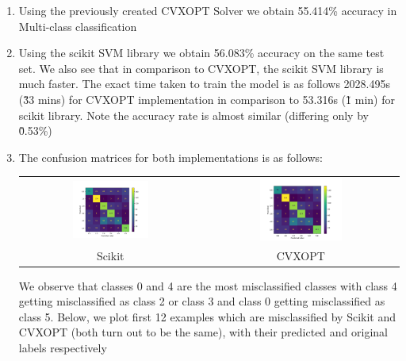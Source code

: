 \documentclass[12pt]{article}
\begin{document}
\begin{enumerate}[label=(\alph*)]
    \item Using the previously created CVXOPT Solver we obtain 55.414\% accuracy in Multi-class classification
    \item Using the scikit SVM library we obtain 56.083\% accuracy on the same test set. We also see that in comparison to CVXOPT, the scikit SVM library is much faster. The exact time taken to train the model is as follows 2028.495s (\~ 33 mins) for CVXOPT implementation in comparison to 53.316s (\~ 1 min) for scikit library. Note the accuracy rate is almost similar (differing only by \~0.53\%)

    \item The confusion matrices for both implementations is as follows:
    \begin{center}
        \begin{tabular}{c c}
            \includegraphics[width=0.44\textwidth]{Images/Q2_multi/confusion_sklearn.png} & \includegraphics[width=0.44\textwidth]{Images/Q2_multi/confusion_cvxopt.png} \\
            Scikit & CVXOPT 
        \end{tabular}
    \end{center}

   We observe that classes 0 and 4 are the most misclassified classes with class 4 getting misclassified as class 2 or class 3 and class 0 getting misclassified as class 5. Below, we plot first 12 examples which are misclassified by Scikit and CVXOPT (both turn out to be the same), with their {\color{red} predicted} and {\color{green} original} labels respectively


\end{enumerate}
\end{document}
